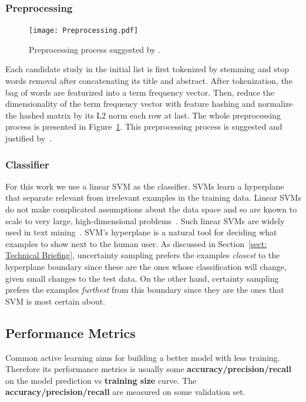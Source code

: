 \documentclass[final,twocolumn,5p]{elsarticle}
\theoremstyle{break}
\begin{document}
\subsubsection{Preprocessing}

\begin{figure}
    \centering
    \texttt{[image: Preprocessing.pdf]}
    \caption{Preprocessing process suggested by \cite{krishna2016bigse}.}
    \label{fig: preprocessing}
\end{figure}

Each candidate study in the initial list is first tokenized by stemming and stop words removal after concatenating its title and abstract. After tokenization, the bag of words are featurized into a term frequency vector. Then, reduce the dimensionality of the term frequency vector with feature hashing and normalize the hashed matrix by its L2 norm each row at last. The whole preprocessing process is presented in Figure~\ref{fig: preprocessing}. This preprocessing process is suggested and justified by~\cite{krishna2016bigse}.

\subsubsection{Classifier}

For this work we use a
linear SVM as the classifier.
SVMs learn a hyperplane that separate relevant from irrelevant examples
in the training data.
Linear SVMs do not make complicated assumptions about the data space
and so are known to scale to very large, high-dimensional
problems~\cite{joachims2006training}. Such linear SVMs are widely used in text
mining~\cite{krishna2016bigse}.
SVM's hyperplane is a natural tool for deciding what examples
to show next to the human user. As discussed in Section~\ref{sect: Technical Briefing}, uncertainty sampling prefers the examples
{\em closest} to the hyperplane boundary since these are the ones whose classification will
change, given small changes to the test data.
On the other hand, certainty sampling prefers
the examples {\em furthest} from this boundary since they are the ones that SVM is most certain about. 

\subsection{Performance Metrics}
\label{subsect: Performance Metrics}

Common active learning aims for building a better model with less training. Therefore its performance metrics is usually some \textbf{accuracy/precision/recall} on the model prediction vs \textbf{training size} curve. The \textbf{accuracy/precision/recall} are measured on some validation set.
\end{document}
